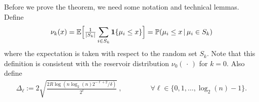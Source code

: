 


Before we prove the theorem, we need some notation and technical lemmas.
Define 
\begin{align*}
\nu_k(x) = \mathbb{E}\Big[ \tfrac{1}{|S_k|} \sum_{i \in S_k} \mathbf{1}\{ \mu_i \leq x \} \Big] = \mathbb{P}( \mu_i \leq x \, | \, \mu_i \in S_k )
\end{align*}
where the expectation is taken with respect to the random set $S_k$. 
Note that this definition is consistent with the reservoir distribution $\nu_0( \, \cdot \, )$ for $k=0$.
Also define
\begin{align*}
\Delta_\ell := 2\sqrt{\frac{2R \log(n \log_2(n) 2^{-\ell+2}/\delta)}{2^\ell}} \ , \qquad\qquad \forall \ell \in \{0,1,\dots,\log_2(n)-1\}.
\end{align*}

